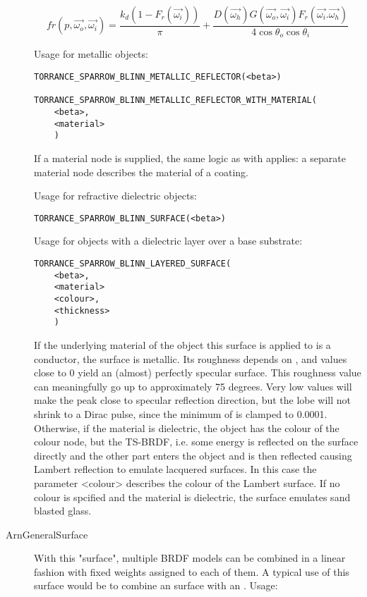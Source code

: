 \begin{description}
  \begin{equation}
    \label{eq:TorranceSparrowART}
    fr(p, \vec{\omega_o}, \vec{\omega_i})=\frac{k_d (1-F_r(\vec{\omega_i}))}{\pi} +
    \frac{D(\vec{\omega_h})
          G(\vec{\omega_o}, \vec{\omega_i})
          F_r(\vec{\omega_i}.\vec{\omega_h})}
         {4\cos\theta_o \cos\theta_i}
  \end{equation}

Usage for metallic objects:

\begin{verbatim}
TORRANCE_SPARROW_BLINN_METALLIC_REFLECTOR(<beta>)

TORRANCE_SPARROW_BLINN_METALLIC_REFLECTOR_WITH_MATERIAL(
    <beta>,
    <material>
    )
\end{verbatim}

If a material node is supplied, the same logic as with  applies: a separate material node describes the material of a coating. 

Usage for refractive dielectric objects:
%
\begin{verbatim}
TORRANCE_SPARROW_BLINN_SURFACE(<beta>)
\end{verbatim}

Usage for objects with a dielectric layer over a base substrate:
%
\begin{verbatim}
TORRANCE_SPARROW_BLINN_LAYERED_SURFACE(
    <beta>,
    <material>
    <colour>,
    <thickness>
    )
\end{verbatim}

If the underlying material of the object this surface is applied to is a conductor, the surface is metallic. Its roughness depends on , and values close to 0 yield an (almost) perfectly specular surface. This roughness value can meaningfully go up to approximately 75 degrees.  Very low values will make the peak close to specular reflection direction, but the lobe will not shrink to a Dirac pulse, since the minimum of  is clamped to 0.0001. Otherwise, if the material is dielectric, the object has the colour of the colour node, but the TS-BRDF, i.e. some energy is reflected on the surface directly and the other part enters the object and is then reflected causing Lambert reflection to emulate lacquered surfaces. In this case the parameter <colour> describes the colour of the Lambert surface. If no colour is spcified and the material is dielectric, the surface emulates sand blasted glass. 

\item[ArnGeneralSurface] With this "surface", multiple BRDF models can be combined in a linear fashion with fixed weights assigned to each of them. A typical use of this surface would be to combine an  surface with an
  . Usage:


\end{description}
